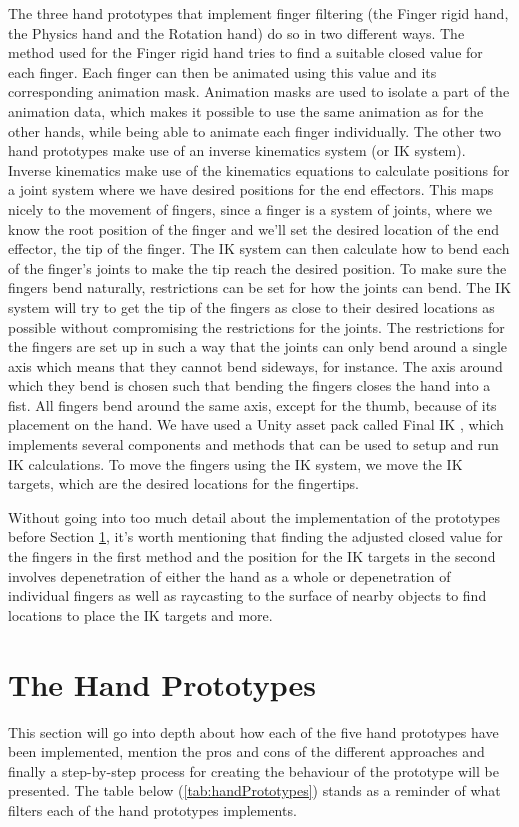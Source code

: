 The three hand prototypes that implement finger filtering (the Finger rigid hand, the Physics hand and the Rotation hand) do so in two different ways. The method used for the Finger rigid hand tries to find a suitable closed value for each finger. Each finger can then be animated using this value and its corresponding animation mask. Animation masks are used to isolate a part of the animation data, which makes it possible to use the same animation as for the other hands, while being able to animate each finger individually. The other two hand prototypes make use of an inverse kinematics system (or IK system). Inverse kinematics make use of the kinematics equations to calculate positions for a joint system where we have desired positions for the end effectors. This maps nicely to the movement of fingers, since a finger is a system of joints, where we know the root position of the finger and we'll set the desired location of the end effector, the tip of the finger. The IK system can then calculate how to bend each of the finger's joints to make the tip reach the desired position. To make sure the fingers bend naturally, restrictions can be set for how the joints can bend. The IK system will try to get the tip of the fingers as close to their desired locations as possible without compromising the restrictions for the joints. The restrictions for the fingers are set up in such a way that the joints can only bend around a single axis which means that they cannot bend sideways, for instance. The axis around which they bend is chosen such that bending the fingers closes the hand into a fist. All fingers bend around the same axis, except for the thumb, because of its placement on the hand. We have used a Unity asset pack called Final IK \parencite{RootMotion2017}, which implements several components and methods that can be used to setup and run IK calculations. To move the fingers using the IK system, we move the IK targets, which are the desired locations for the fingertips.

Without going into too much detail about the implementation of the prototypes before Section \ref{sec:handPrototypes}, it's worth mentioning that finding the adjusted closed value for the fingers in the first method and the position for the IK targets in the second involves depenetration of either the hand as a whole or depenetration of individual fingers as well as raycasting to the surface of nearby objects to find locations to place the IK targets and more.

\section{The Hand Prototypes}
\label{sec:handPrototypes}
This section will go into depth about how each of the five hand prototypes have been implemented, mention the pros and cons of the different approaches and finally a step-by-step process for creating the behaviour of the prototype will be presented. The table below (\ref{tab:handPrototypes}) stands as a reminder of what filters each of the hand prototypes implements.

